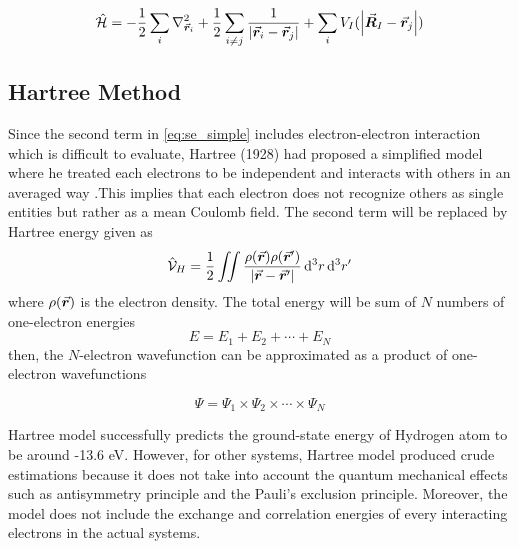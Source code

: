 \begin{equation} \label{eq:se_simple}
	\hat{\mathcal{H}}  = - \frac{1}{2} \sum_i \laplacian_{\va*{r}_i} + \frac{1}{2} \sum_{i\neq j} \frac{1}{\abs{\va*{r}_i - \va*{r}_j}} + \sum_{i} V_{I}(\abs{\va*{R}_I - \va*{r}_j})
\end{equation}
\subsection{Hartree Method}
Since the second term in \eqref{eq:se_simple} includes electron-electron interaction which is difficult to evaluate, Hartree (1928) had proposed a simplified model where he treated each electrons to be independent and interacts with others in an averaged way \citep{Hartree1928}.This implies that each  electron does not recognize others as single entities but rather as a mean Coulomb field. The second term will be replaced by Hartree energy given as
\begin{equation} \label{eq:hartree_E}
	\hat{\mathcal{V}}_H = \frac{1}{2} \iint \frac{\rho(\va*{r}) \rho(\va*{r}')}{\abs{{\va*{r} - \va*{r}'}}} \dd[3]{r} \dd[3]{r'}
\end{equation}
where $\rho(\va*{r})$ is the electron density. The total energy will be sum of $N$ numbers of one-electron energies
\begin{equation}
	E = E_1 + E_2 + \cdots + E_N
\end{equation}
then, the $N$-electron wavefunction can be approximated as a product of one-electron wavefunctions

\begin{equation}
	\Psi = \Psi_1 \times \Psi_2 \times \cdots \times \Psi_N
\end{equation}

Hartree model successfully predicts the ground-state energy of Hydrogen atom to be around -13.6 eV. However, for other systems, Hartree model produced crude estimations because it does not take into account the quantum mechanical effects such as antisymmetry principle and the Pauli's exclusion principle. Moreover, the model does not include the exchange and correlation energies of every interacting electrons in the actual systems.

